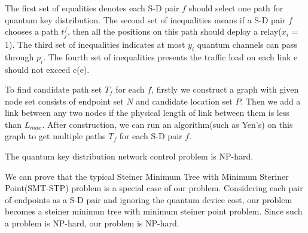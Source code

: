 The first set of equalities denotes each S-D pair $f$ should select one path for quantum key distribution. The second set of inequalities means if a S-D pair $f$ chooses a path $t_j^f$, then all the positions on this path should deploy a relay($x_i$ = 1). The third set of inequalities indicates at most $y_i$ quantum channels can pass through $p_i$. The fourth set of inequalities presents the traffic load on each link e should not exceed c(e).

To find candidate path set $T_f$ for each $f$, firstly we construct a graph with given node set consists of endpoint set $N$ and candidate location set $P$. Then we add a link between any two nodes if the physical length of link between them is less than $L_{max}$. After construction, we can run an algorithm(such as Yen's\cite{Multipaths}) on this graph to get multiple paths $T_f$ for each S-D pair $f$.

\begin{theorem}
  The quantum key distribution network control problem is NP-hard.
\end{theorem}

We can prove that the typical Steiner Minimum Tree with Minimum Steriner Point(SMT-STP) problem is a special case of our problem. Considering each pair of endpoints as a S-D pair and ignoring the quantum device cost, our problem becomes a steiner minimun tree with minimum steiner point problem. Since such a problem is NP-hard, our problem is NP-hard.

%

